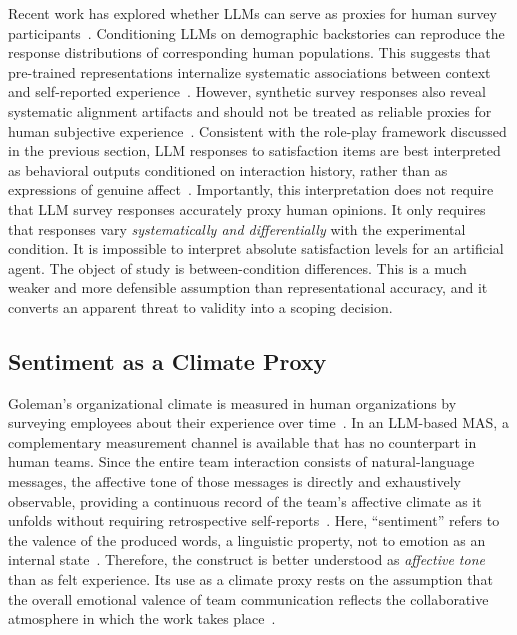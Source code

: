 Recent work has explored whether \acp{LLM} can serve as proxies for human survey participants~\cite{argyle2023outofonemanyllmstosimulatehumansamples, dominguezolmedo2024questioningsurveyresponseslarge, hu2024quantifyingpersonaeffectllm}.
Conditioning \acp{LLM} on demographic backstories can reproduce the response distributions of corresponding human populations.
This suggests that pre-trained representations internalize systematic associations between context and self-reported experience~\cite{argyle2023outofonemanyllmstosimulatehumansamples}.
However, synthetic survey responses also reveal systematic alignment artifacts and should not be treated as reliable proxies for human subjective experience~\cite{dominguezolmedo2024questioningsurveyresponseslarge}.
Consistent with the role-play framework discussed in the previous section, \ac{LLM} responses to satisfaction items are best interpreted as behavioral outputs conditioned on interaction history, rather than as expressions of genuine affect~\cite{shanahan2023roleplaylargelanguagemodels, salewski2023incontextimpersonationrevealslarge}.
Importantly, this interpretation does not require that \ac{LLM} survey responses accurately proxy human opinions.
It only requires that responses vary \textit{systematically and differentially} with the experimental condition.
It is impossible to interpret absolute satisfaction levels for an artificial agent. 
The object of study is between-condition differences.
This is a much weaker and more defensible assumption than representational accuracy, and it converts an apparent threat to validity into a scoping decision.

\subsection{Sentiment as a Climate Proxy}
\label{subsec:sentiment-climate-proxy}

Goleman's organizational climate is measured in human organizations by surveying employees about their experience over time~\cite{goleman2000leadership}.
In an \ac{LLM}-based \ac{MAS}, a complementary measurement channel is available that has no counterpart in human teams.
Since the entire team interaction consists of natural-language messages, the affective tone of those messages is directly and exhaustively observable, providing a continuous record of the team's affective climate as it unfolds without requiring retrospective self-reports~\cite{almutairi2025taifaautomatedfeedback}.
Here, ``sentiment'' refers to the valence of the produced words, a linguistic property, not to emotion as an internal state~\cite{hutto2014vader}.
Therefore, the construct is better understood as \textit{affective tone} than as felt experience.
Its use as a climate proxy rests on the assumption that the overall emotional valence of team communication reflects the collaborative atmosphere in which the work takes place~\cite{almutairi2025taifaautomatedfeedback}.

